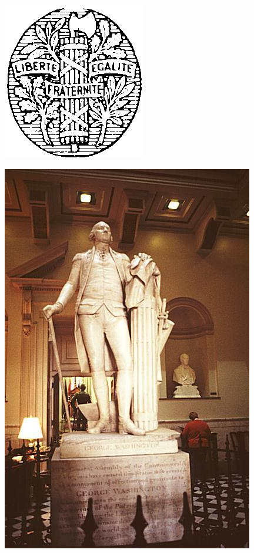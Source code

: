 \begin{frame}
    \centering
    \includegraphics[width=.9\textwidth]{img/fasces/french-republic-symbol.png} \\
\end{frame}
\begin{frame}
    \centering
    \includegraphics[width=.9\textwidth]{img/fasces/houdon-front.jpg} \\
\end{frame}
